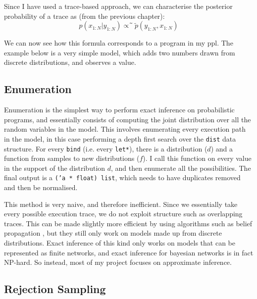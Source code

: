 Since I have used a trace-based approach, we can characterise the posterior probability of a trace as (from the previous chapter):
$$p(x_{1:N}|y_{1:N})\propto ̃\tilde{p}(y_{1:N},x_{1:N})$$

We can now see how this formula corresponds to a program in my ppl. The example below is a very simple model, which adds two numbers drawn from discrete distributions, and observes a value.


\subsection{Enumeration} \label{sec:enum}
Enumeration is the simplest way to perform exact inference on probabilistic programs, and essentially consists of computing the joint distribution over all the random variables in the model. This involves enumerating every execution path in the model, in this case performing a depth first search over the \texttt{dist} data structure. For every \texttt{bind} (i.e. every \texttt{let*}), there is a distribution ($d$) and a function from samples to new distributions ($f$). I call this function on every value in the support of the distribution $d$, and then enumerate all the possibilities. The final output is a \texttt{('a * float) list}, which needs to have duplicates removed and then be normalised.



This method is very naive, and therefore inefficient. Since we essentially take every possible execution trace, we do not exploit structure such as overlapping traces. This can be made slightly more efficient by using algorithms such as belief propagation \cite{belief-prop}, but they still only work on models made up from discrete distributions. Exact inference of this kind only works on models that can be represented as finite networks, and exact inference for bayesian networks is in fact NP-hard\cite{cooper1990computational}. So instead, most of my project focuses on approximate inference.

\subsection{Rejection Sampling} \label{sec:rej}
